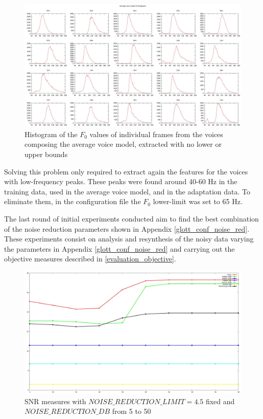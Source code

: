 \begin{figure}[!htb]
\begin{centering}
\includegraphics[width=\textwidth]{images/av_model_=conf_f0_histogram.jpg}
\caption{Histogram of the $F_{0}$ values of individual frames from the voices composing the average voice model, extracted with no lower or upper bounds}
\label{fig:f0_histograms}
\end{centering}
\end{figure}

Solving this problem only required to extract again the features for the voices with low-frequency peaks.
%
These peaks were found around 40-60 Hz in the training data, used in the average voice model, and in the adaptation data.
%
To eliminate them, in the configuration file the $F_{0}$ lower-limit was set to 65 Hz.

The last round of initial experiments conducted aim to find the best combination of the noise reduction parameters shown in Appendix \ref{glott_conf_noise_red}.
%
These experiments consist on analysis and resynthesis of the noisy data varying the parameters in Appendix \ref{glott_conf_noise_red} and carrying out the objective measures described in \ref{evaluation_objective}.
%

\begin{figure}[!htb]
\begin{centering}
\includegraphics[width=\textwidth]{images/noise_red_snr_exp.jpg}
\caption{SNR measures with $NOISE\_REDUCTION\_LIMIT = 4.5$ fixed and $NOISE\_REDUCTION\_DB$ from 5 to 50}
\label{fig:noise_red_snr}
\end{centering}
\end{figure}

